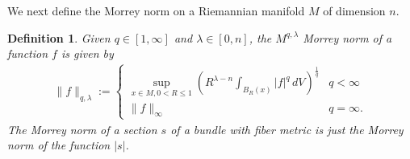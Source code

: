 \documentclass[12pt]{amsart}
\renewcommand{\1}{{\mathbf 1}}
\theoremstyle{others}
\newtheorem{defn}[thm]{Definition}
\numberwithin{equation}{section}
\begin{document}

We next define the Morrey norm on a Riemannian manifold $M$ of dimension \(n\).
        \begin{defn}\label{preliminaries:morreynormdefinition}
		 Given \(q \in [1, \infty]\) and \(\lambda \in [0, n]\), the $M^{q, \lambda}$ \emph{Morrey norm} of a function \(f\) is given by
    \begin{align*}
        \|f\|_{q, \lambda} := 
        \begin{cases}
            \sup_{x \in M, 0 < R \leq 1} \left(R^{\lambda-n} \int_{B_R(x)} |f|^q \, dV\right)^{\frac{1}{q}} & q < \infty \\
            \|f\|_\infty & q = \infty.
        \end{cases}
    \end{align*} The Morrey norm of a section \(s\) of a bundle with fiber metric is just the Morrey norm of the function \(|s|\).
	\end{defn}  \par
 
\end{document}
